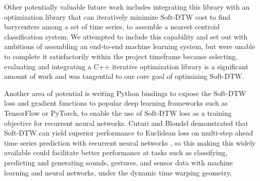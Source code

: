 \documentclass[12pt, letterpaper]{article}
\begin{document}
Other potentially valuable future work includes integrating this library with an
optimization library that can iteratively minimize Soft-DTW cost to find
barycenters among a set of time series, to assemble a nearest centroid
classification system. We attempted to include this capability and set out with
ambitions of assembling an end-to-end machine learning system, but were unable
to complete it satisfactorily within the project timeframe because selecting,
evaluating and integrating a C++ iterative optimization library is a significant
amount of work and was tangential to our core goal of optimizing Soft-DTW.

Another area of potential is writing Python bindings to expose the Soft-DTW loss
and gradient functions to popular deep learning frameworks such as TensorFlow or
PyTorch, to enable the use of Soft-DTW loss as a training objective for
recurrent neural networks. Cuturi and Blondel demonstrated that Soft-DTW can
yield superior performance to Euclidean loss on multi-step ahead time series
prediction with recurrent neural networks \cite{cuturi_soft-dtw_2018}, so this
making this widely available could facilitate better performance at tasks such
as classifying, predicting and generating sounds, gestures, and sensor data with
machine learning and neural networks, under the dynamic time warping geometry.

\printbibliography[]
\end{document}
